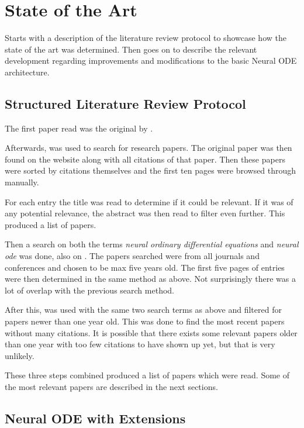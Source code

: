 \documentclass[12pt,a4paper]{book}
\begin{document}
\chapter{State of the Art}
\label{cha:sota}

Starts with a description of the literature review protocol to showcase how the state of the art was determined. Then goes on to describe the relevant development regarding improvements and modifications to the basic Neural ODE architecture.

\section{Structured Literature Review Protocol}

The first paper read was the original by \cite{node}.

Afterwards, \href{https://www.scinapse.io/}{\color{cyan}{Scinapse}} was used to search for research papers. The original paper was then found on the website along with all citations of that paper. Then these papers were sorted by citations themselves and the first ten pages were browsed through manually.

For each entry the title was read to determine if it could be relevant. If it was of any potential relevance, the abstract was then read to filter even further. This produced a list of papers.

Then a search on both the terms \textit{neural ordinary differential equations} and \textit{neural ode} was done, also on \href{https://www.scinapse.io/}{\color{cyan}{Scinapse}}. The papers searched were from all journals and conferences and chosen to be max five years old. The first five pages of entries were then determined in the same method as above. Not surprisingly there was a lot of overlap with the previous search method.

After this, \href{https://scholar.google.com/}{\color{cyan}{Google Scholar}} was used with the same two search terms as above and filtered for papers newer than one year old. This was done to find the most recent papers without many citations. It is possible that there exists some relevant papers older than one year with too few citations to have shown up yet, but that is very unlikely.

These three steps combined produced a list of papers which were read. Some of the most relevant papers are described in the next sections.

\section{Neural ODE with Extensions}
\end{document}
